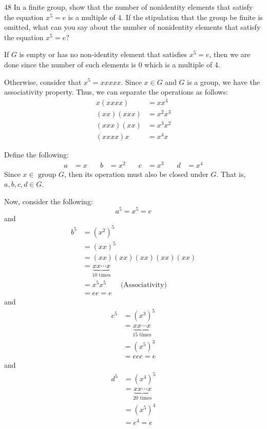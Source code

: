 \begin{hwproblem}
{48}{
    In a finite group, show that the number of nonidentity elements that satisfy the equation $x^5=e$ is a multiple of 4. If the stipulation that the group be finite is omitted, what can you say about the number of nonidentity elements that satisfy the equation $x^5=e$?
}

If \(G\) is empty or has no non-identity element that satisfies \(x^5 = e\), then we are done since the number of such elements is 0 which is a multiple of 4.

Otherwise, consider that \(x^5 = xxxxx\). Since \(x \in G\) and \(G\) is a group, we have the associativity property. Thus, we can separate the operations as follows:
\[
\begin{aligned}
    x(xxxx) &= xx^4 \\
    (xx)(xxx) &= x^2x^3 \\
    (xxx)(xx) &= x^3x^2 \\
    (xxxx)x &= x^4x
\end{aligned}
\]

Define the following:
\[
\begin{aligned}
    a &= x &\quad b &= x^2 &\quad c &= x^3 &\quad d &= x^4
\end{aligned}
\]
Since \(x \in \text{ group } G\), then its operation must also be closed under \(G\). That is, \(a, b, c, d \in G\).

Now, consider the following:
\[
    a^5 = x^5 = e
\]
and
\[
\begin{aligned}
    b^5 &= (x^2)^5 \\
        &= (xx)^5 \\
        &= (xx)(xx)(xx)(xx)(xx) \\
        &= \underbrace{xx \cdots x}_\text{10 times} \\
        &= x^5x^5 \qquad \text{(Associativity)} \\
        &= ee = e
\end{aligned}
\]
and
\[
\begin{aligned}
    c^5 &= (x^3)^5 \\
        &= \underbrace{xx \cdots x}_{\text{15 times}} \\
        &= (x^5)^3 \\
        &= eee = e
\end{aligned}
\]
and
\[
\begin{aligned}
    d^5 &= (x^4)^5 \\
        &= \underbrace{xx \cdots x}_\text{20 times} \\
        &= (x^5)^4 \\
        &= e^4 = e
\end{aligned}
\]


\end{hwproblem}
